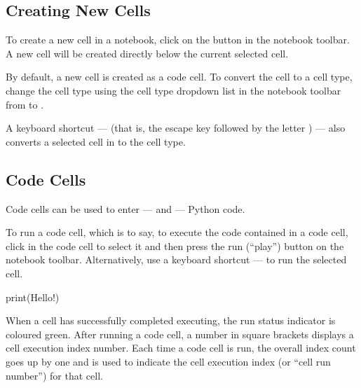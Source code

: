 \documentclass[letterpaper,10pt,english]{sphinxmanual}
\begin{document}
\subsection{Creating New Cells}
\label{\detokenize{content/00_READ_ME_FIRST/Section_00_06_RoboLab_Environment:Creating-New-Cells}}
To create a new cell in a notebook, click on the \sphinxcode{\sphinxupquote{+}} button in the notebook toolbar. A new cell will be created directly below the current selected cell.

By default, a new cell is created as a code cell. To convert the cell to a  cell type, change the cell type using the cell type drop\sphinxhyphen{}down list in the notebook toolbar from  to .

A keyboard shortcut —  (that is, the escape key followed by the letter ) — also converts a selected cell in  to the  cell type.


\subsection{Code Cells}
\label{\detokenize{content/00_READ_ME_FIRST/Section_00_06_RoboLab_Environment:Code-Cells}}
Code cells can be used to enter — and  — Python code.

To run a code cell, which is to say, to execute the code contained in a code cell, click in the code cell to select it and then press the run (“play”) button on the notebook toolbar. Alternatively, use a keyboard shortcut \sphinxhyphen{}  — to run the selected cell.

{
\begin{sphinxVerbatim}[commandchars=\\\{\}]
\llap{\color{nbsphinxin}[ ]:\,\hspace{\fboxrule}\hspace{\fboxsep}}print(\PYGZdq{}Hello!\PYGZdq{})
\end{sphinxVerbatim}
}

When a cell has successfully completed executing, the run status indicator is coloured green. After running a code cell, a number in square brackets displays a cell execution index number. Each time a code cell is run, the overall index count goes up by one and is used to indicate the cell execution index (or “cell run number”) for that cell.
\end{document}
